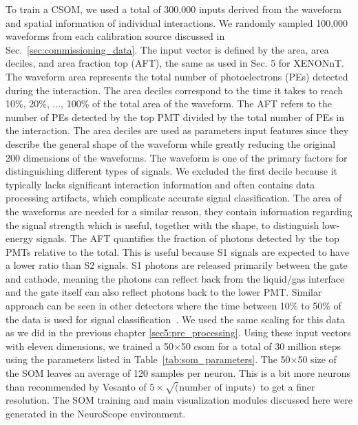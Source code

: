 To train a CSOM, we used a total of 300,000 inputs derived from the waveform and spatial information of individual interactions. We randomly sampled 100,000 waveforms from each calibration source discussed in Sec.~\ref{sec:commissioning_data}. The input vector is defined by the area, area deciles, and area fraction top (AFT), the same as used in Sec. 5 for XENONnT. The waveform area represents the total number of photoelectrons (PEs) detected during the interaction. The area deciles correspond to the time it takes to reach 10\%, 20\%, ..., 100\% of the total area of the waveform. The AFT refers to the number of PEs detected by the top PMT divided by the total number of PEs in the interaction. The area deciles are used as parameters input features since they describe the general shape of the waveform while greatly reducing the original 200 dimensions of the waveforms. The waveform is one of the primary factors for distinguishing different types of signals. We excluded the first decile because it typically lacks significant interaction information and often contains data processing artifacts, which complicate accurate signal classification. The area of the waveforms are needed for a similar reason, they contain information regarding the signal strength which is useful, together with the shape, to distinguish low-energy signals. The AFT quantifies the fraction of photons detected by the top PMTs relative to the total. This is useful because S1 signals are expected to have a lower ratio than S2 signals. S1 photons are released primarily between the gate and cathode, meaning the photons can reflect back from the liquid/gas interface and the gate itself can also reflect photons back to the lower PMT. Similar approach can be seen in other detectors where the time between 10\% to 50\% of the data is used for signal classification~\cite{sanchez2023som}. We used the same scaling for this data as we did in the previous chapter \ref{sec5:pre_processing}. Using these input vectors with eleven dimensions, we trained a 50$\times$50  \acrfull{csom} for a total of 30 million steps using the parameters listed in Table~\ref{tab:som_parameters}. The 50$\times$50 size of the SOM leaves an average of 120 samples per neuron. This is a bit more neurons than recommended by Vesanto of $5 \times \sqrt(\text{number of inputs})$\,\cite{Vesanto2000} to get a finer resolution. The SOM training and main visualization modules discussed here were generated in the NeuroScope \cite{Alma_NS, Alma_website} environment.



